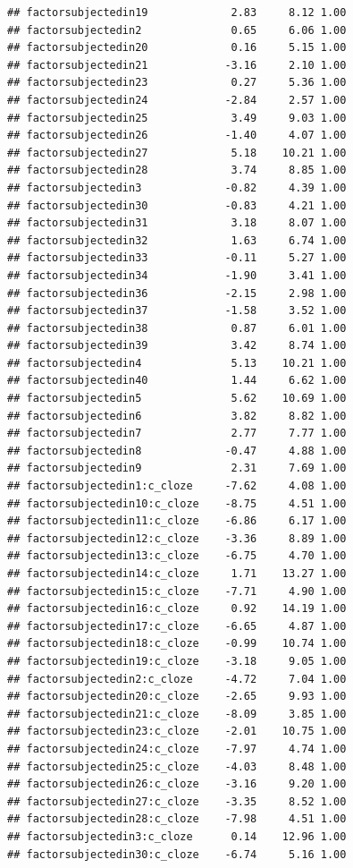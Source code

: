 \documentclass[12pt,ignorenonframetext,aspectratio=169]{beamer}
\begin{document}
\begin{frame}[fragile]
\begin{verbatim}
## factorsubjectedin19             2.83     8.12 1.00
## factorsubjectedin2              0.65     6.06 1.00
## factorsubjectedin20             0.16     5.15 1.00
## factorsubjectedin21            -3.16     2.10 1.00
## factorsubjectedin23             0.27     5.36 1.00
## factorsubjectedin24            -2.84     2.57 1.00
## factorsubjectedin25             3.49     9.03 1.00
## factorsubjectedin26            -1.40     4.07 1.00
## factorsubjectedin27             5.18    10.21 1.00
## factorsubjectedin28             3.74     8.85 1.00
## factorsubjectedin3             -0.82     4.39 1.00
## factorsubjectedin30            -0.83     4.21 1.00
## factorsubjectedin31             3.18     8.07 1.00
## factorsubjectedin32             1.63     6.74 1.00
## factorsubjectedin33            -0.11     5.27 1.00
## factorsubjectedin34            -1.90     3.41 1.00
## factorsubjectedin36            -2.15     2.98 1.00
## factorsubjectedin37            -1.58     3.52 1.00
## factorsubjectedin38             0.87     6.01 1.00
## factorsubjectedin39             3.42     8.74 1.00
## factorsubjectedin4              5.13    10.21 1.00
## factorsubjectedin40             1.44     6.62 1.00
## factorsubjectedin5              5.62    10.69 1.00
## factorsubjectedin6              3.82     8.82 1.00
## factorsubjectedin7              2.77     7.77 1.00
## factorsubjectedin8             -0.47     4.88 1.00
## factorsubjectedin9              2.31     7.69 1.00
## factorsubjectedin1:c_cloze     -7.62     4.08 1.00
## factorsubjectedin10:c_cloze    -8.75     4.51 1.00
## factorsubjectedin11:c_cloze    -6.86     6.17 1.00
## factorsubjectedin12:c_cloze    -3.36     8.89 1.00
## factorsubjectedin13:c_cloze    -6.75     4.70 1.00
## factorsubjectedin14:c_cloze     1.71    13.27 1.00
## factorsubjectedin15:c_cloze    -7.71     4.90 1.00
## factorsubjectedin16:c_cloze     0.92    14.19 1.00
## factorsubjectedin17:c_cloze    -6.65     4.87 1.00
## factorsubjectedin18:c_cloze    -0.99    10.74 1.00
## factorsubjectedin19:c_cloze    -3.18     9.05 1.00
## factorsubjectedin2:c_cloze     -4.72     7.04 1.00
## factorsubjectedin20:c_cloze    -2.65     9.93 1.00
## factorsubjectedin21:c_cloze    -8.09     3.85 1.00
## factorsubjectedin23:c_cloze    -2.01    10.75 1.00
## factorsubjectedin24:c_cloze    -7.97     4.74 1.00
## factorsubjectedin25:c_cloze    -4.03     8.48 1.00
## factorsubjectedin26:c_cloze    -3.16     9.20 1.00
## factorsubjectedin27:c_cloze    -3.35     8.52 1.00
## factorsubjectedin28:c_cloze    -7.98     4.51 1.00
## factorsubjectedin3:c_cloze      0.14    12.96 1.00
## factorsubjectedin30:c_cloze    -6.74     5.16 1.00

\end{verbatim}
\end{frame}
\end{document}
